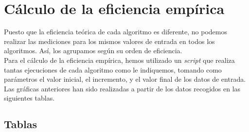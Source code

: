 \documentclass[11pt]{article}
\begin{document}
\section*{Cálculo de la eficiencia empírica}

Puesto que la eficiencia teórica de cada algoritmo es diferente, no podemos realizar las mediciones para los mismos valores de entrada en todos los algoritmos. Así, los agrupamos según su orden de eficiencia.\\

Para el cálculo de la eficiencia empírica, hemos utilizado un \textit{script} que realiza tantas ejecuciones de cada algoritmo como le indiquemos, tomando como parámetros el valor inicial, el incremento, y el valor final de los datos de entrada.\\

Las gráficas anteriores han sido realizadas a partir de los datos recogidos en las siguientes tablas.

\subsection*{Tablas}


\burbujalinuxOCero
{}\seleccionlinuxOCero
{}\insercionlinuxOCero

 {\burbujalinuxOCero}
 {\burbujalinuxOCero}
 {\burbujalinuxOCero}

\mergesortlinuxOCero
{}\quicksortlinuxOCero
{}\heapsortlinuxOCero

 {\mergesortlinuxOCero}
 {\mergesortlinuxOCero}
 {\mergesortlinuxOCero}

\floydlinuxOCero
{}\hanoilinuxOCero
\end{document}

